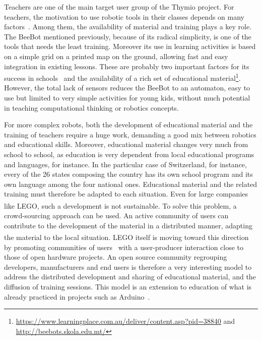 \documentclass[letterpaper, 10 pt, conference]{ieeeconf}  %
\begin{document}
Teachers are one of the main target user group of the Thymio project.
For teachers, the motivation to use robotic tools in their classes depends on many factors~\cite{chevalier2016}.
Among them, the availability of material and training plays a key role.
The BeeBot mentioned previously, because of its radical simplicity, is one of the tools that needs the least training. 
Moreover its use in learning activities is based on a simple grid on a printed map on the ground, allowing fast and easy integration in existing lessons.
These are probably two important factors for its success in schools~\cite{2008highfield,2008demichele} and the availability of a rich set of educational material\footnote{\url{https://www.learningplace.com.au/deliver/content.asp?pid=38840} and \\ \url{http://beebots.skola.edu.mt/}}.
However, the total lack of sensors reduces the BeeBot to an automaton, easy to use but limited to very simple activities for young kids, without much potential in teaching computational thinking or robotics concepts.

For more complex robots, both the development of educational material and the training of teachers require a huge work, demanding a good mix between robotics and educational skills. 
Moreover, educational material changes very much from school to school, as education is very dependent from local educational programs and languages, for instance. 
In the particular case of Switzerland, for instance, every of the 26 states composing the country has its own school program and its own language among the four national ones. 
Educational material and the related training must therefore be adapted to each situation.
Even for large companies like LEGO\textsuperscript{\textregistered}, such a development is not sustainable. 
To solve this problem, a crowd-sourcing approach can be used.
An active community of users can contribute to the development of the material in a distributed manner, adapting the material to the local situation.
LEGO\textsuperscript{\textregistered} itself is moving toward this direction by promoting communities of users~\cite{Hienerth2014} with a user-producer interaction close to those of open hardware projects.
An open source community regrouping developers, manufacturers and end users is therefore a very interesting model to address the distributed development and sharing of educational material, and the diffusion of training sessions.
This model is an extension to education of what is already practiced in projects such as Arduino~\cite{Jamieson2010}.
\end{document}
